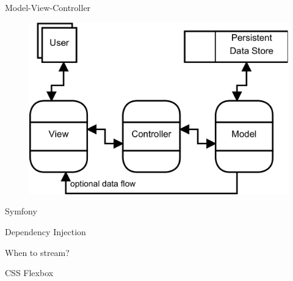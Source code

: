 




Model-View-Controller \citep[Seite 176f]{voorhees2020guide}

\begin{figure}[H]
    \centering
    \includegraphics[width=.7\linewidth]{../img/mvc.png}
    \caption{\citep[Seite 177]{voorhees2020guide}}
\end{figure}

Symfony \citep{potencier2022symfony}

Dependency Injection \citep{seemann2019dependency}

When to stream? \citep{braaksma2014streaming}

CSS Flexbox \citep{flexbox-csstricks}






